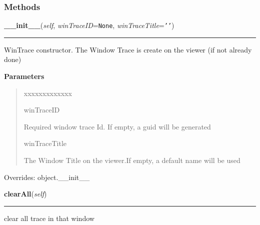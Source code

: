   \subsubsection{Methods}

    \vspace{0.5ex}

\hspace{.8\funcindent}\begin{boxedminipage}{\funcwidth}

    \raggedright \textbf{\_\_init\_\_}(\textit{self}, \textit{winTraceID}={\tt None}, \textit{winTraceTitle}={\tt \texttt{'}\texttt{}\texttt{'}})

    \vspace{-1.5ex}

    \rule{\textwidth}{0.5\fboxrule}
\setlength{\parskip}{2ex}
    WinTrace constructor. The Window Trace is create on the viewer (if not 
    already done)

\setlength{\parskip}{1ex}
      \textbf{Parameters}
      \vspace{-1ex}

      \begin{quote}
        \begin{Ventry}{xxxxxxxxxxxxx}

          \item[winTraceID]

          Required window trace Id. If empty, a guid will be generated

          \item[winTraceTitle]

          The Window Title on the viewer.If empty, a default name will be 
          used

        \end{Ventry}

      \end{quote}

      Overrides: object.\_\_init\_\_

    \end{boxedminipage}

    \label{tracetool:WinTrace:clearAll}

    \vspace{0.5ex}

\hspace{.8\funcindent}\begin{boxedminipage}{\funcwidth}

    \raggedright \textbf{clearAll}(\textit{self})

    \vspace{-1.5ex}

    \rule{\textwidth}{0.5\fboxrule}
\setlength{\parskip}{2ex}
    clear all trace in that window

\setlength{\parskip}{1ex}
    \end{boxedminipage}

